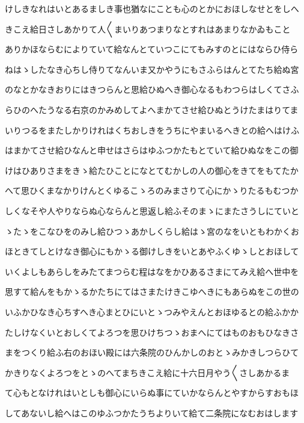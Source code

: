 \documentclass[a4paper,11pt,landscape]{ltjtarticle}
\begin{document}
けしきなれはいとあるましき事也猶なにことも心のとかにおほしなせとをしへ
\par\medskip
きこえ給日さしあかりて人〱まいりあつまりなとすれはあまりなかゐもこと
\par\medskip
ありかほならむによりていて給なんとていつこにてもみすのとにはならひ侍ら
\par\medskip
ねはゝしたなき心ちし侍りてなんいま又かやうにもさふらはんとてたち給ぬ宮
\par\medskip
のなとかなきおりにはきつらんと思給ひぬへき御心なるもわつらはしくてさふ
\par\medskip
らひのへたうなる右京のかみめしてよへまかてさせ給ひぬとうけたまはりてま
\par\medskip
いりつるをまたしかりけれはくちおしきをうちにやまいるへきとの給へはけふ
\par\medskip
はまかてさせ給ひなんと申せはさらはゆふつかたもとていて給ひぬなをこの御
\par\medskip
けはひありさまをきゝ給たひことになとてむかしの人の御心をきてをもてたか
\par\medskip
へて思ひくまなかりけんとくゆるこゝろのみまさりて心にかゝりたるもむつか
\par\medskip
しくなそや人やりならぬ心ならんと思返し給ふそのまゝにまたさうしにていと
\par\medskip
ゝたゝをこなひをのみし給ひつゝあかしくらし給はゝ宮のなをいともわかくお
\par\medskip
ほときてしとけなき御心にもかゝる御けしきをいとあやふくゆゝしとおほして
\par\medskip
いくよしもあらしをみたてまつらむ程はなをかひあるさまにてみえ給へ世中を
\par\medskip
思すて給んをもかゝるかたちにてはさまたけきこゆへきにもあらぬをこの世の
\par\medskip
いふかひなき心ちすへき心まとひにいとゝつみやえんとおほゆるとの給ふかか
\par\medskip
たしけなくいとおしくてよろつを思ひけちつゝおまへにてはものおもひなきさ
\par\medskip
まをつくり給ふ右のおほい殿には六条院のひんかしのおとゝみかきしつらひて
\par\medskip
かきりなくよろつをとゝのへてまちきこえ給に十六日月やう〱さしあかるま
\par\medskip
て心もとなけれはいとしも御心にいらぬ事にていかならんとやすからすおもほ
\par\medskip
してあないし給へはこのゆふつかたうちよりいて給て二条院になむおはします
\par\medskip
\end{document}
